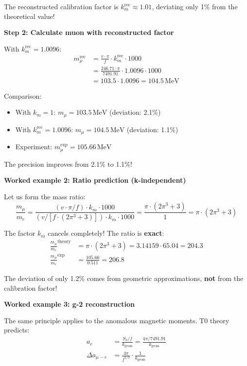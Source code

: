 	The reconstructed calibration factor is \(k_m^{\text{rec}} \approx 1.01\), deviating only 1\% from the theoretical value!
	
	\textbf{Step 2: Calculate muon with reconstructed factor}
	
	With \(k_m^{\text{rec}} = 1.0096\):
	\begin{align}
		m_\mu^{\text{rec}} &= \frac{v \cdot \pi}{f} \cdot k_m^{\text{rec}} \cdot 1000 \\
		&= \frac{246.71 \cdot \pi}{7491.91} \cdot 1.0096 \cdot 1000 \\
		&= 103.5 \cdot 1.0096 = 104.5\,\text{MeV}
	\end{align}
	
	Comparison:
	\begin{itemize}
		\item With \(k_m = 1\): \(m_\mu = 103.5\,\text{MeV}\) (deviation: 2.1\%)
		\item With \(k_m^{\text{rec}} = 1.0096\): \(m_\mu = 104.5\,\text{MeV}\) (deviation: 1.1\%)
		\item Experiment: \(m_\mu^{\exp} = 105.66\,\text{MeV}\)
	\end{itemize}
	
	The precision improves from 2.1\% to 1.1\%!
	
	\textbf{Worked example 2: Ratio prediction (k-independent)}
	
	Let us form the mass ratio:
	\begin{equation}
		\frac{m_\mu}{m_e} = \frac{(v \cdot \pi / f) \cdot k_m \cdot 1000}{(v / [f \cdot (2\pi^3 + 3)]) \cdot k_m \cdot 1000} = \frac{\pi \cdot (2\pi^3 + 3)}{1} = \pi \cdot (2\pi^3 + 3)
	\end{equation}
	
	The factor \(k_m\) cancels completely! The ratio is \textbf{exact}:
	\begin{align}
		\frac{m_\mu}{m_e}^{\text{theory}} &= \pi \cdot (2\pi^3 + 3) = 3.14159 \cdot 65.04 = 204.3 \\
		\frac{m_\mu}{m_e}^{\exp} &= \frac{105.66}{0.511} = 206.8
	\end{align}
	
	The deviation of only 1.2\% comes from geometric approximations, \textbf{not} from the calibration factor!
	
	\textbf{Worked example 3: g-2 reconstruction}
	
	The same principle applies to the anomalous magnetic moments. T0 theory predicts:
	\begin{align}
		a_e &= \frac{S_3/f}{k_{\text{geom}}} = \frac{4\pi/7491.91}{k_{\text{geom}}} \\
		\Delta a_{\mu-e} &= \frac{4\pi}{f^{5/3}} \cdot \frac{1}{k_{\text{geom}}}
	\end{align}
	
